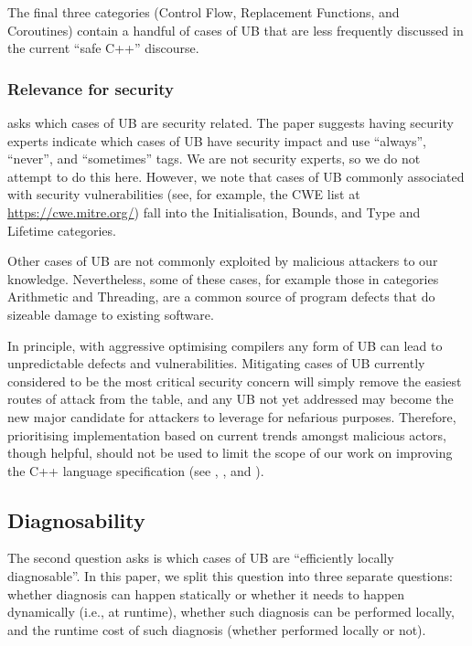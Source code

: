 The final three categories (Control Flow, Replacement Functions, and Coroutines) contain a handful of cases of UB that are less frequently discussed in the current ``safe C++'' discourse.

\subsubsection{Relevance for security}

\cite{P3656R1} asks which cases of UB are security related. The paper suggests having security experts indicate which cases of UB have security impact and use ``always'', ``never'', and ``sometimes'' tags. We are not security experts, so we do not attempt to do this here. However, we note that cases of UB commonly associated with security vulnerabilities (see, for example, the CWE list at \url{https://cwe.mitre.org/}) fall into the Initialisation, Bounds, and Type and Lifetime categories. 

Other cases of UB are not commonly exploited by malicious attackers to our knowledge. Nevertheless, some of these cases, for example those in categories Arithmetic and Threading, are a common source of program defects that do sizeable damage to existing software.

In principle, with aggressive optimising compilers any form of UB can lead to unpredictable defects and vulnerabilities. Mitigating cases of UB currently considered to be the most critical security concern will simply remove the easiest routes of attack from the table, and any UB not yet addressed may become the new major candidate for attackers to leverage for nefarious purposes.  Therefore, prioritising implementation based on current trends amongst malicious actors, though helpful, should not be used to limit the scope of our work on improving the C++ language specification (see \cite{Sutter2024}, \cite{P3500R1}, and \cite{P3578R0}).

\subsection{Diagnosability} 

The second question \cite{P3656R1} asks is which cases of UB are ``efficiently locally diagnosable''. In this paper, we split this question into three separate questions: whether diagnosis can happen statically or whether it needs to happen dynamically (i.e., at runtime), whether such diagnosis can be performed locally, and the runtime cost of such diagnosis (whether performed locally or not).

